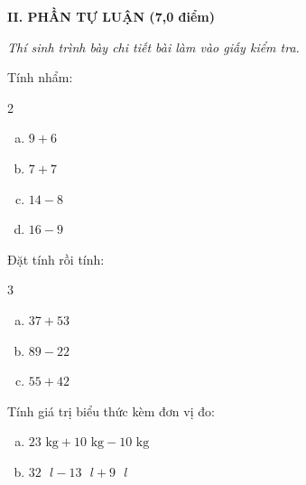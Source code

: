 \vspace{4mm}
\textbf{\large II. PHẦN TỰ LUẬN (7,0 điểm)}

{\itshape Thí sinh trình bày chi tiết bài làm vào giấy kiểm tra.}

\begin{bt}[1,0 điểm]
Tính nhẩm:
\begin{multicols}{2}
\begin{enumerate}[a)]
  \item $9 + 6$
  \item $7 + 7$
  \item $14 - 8$
  \item $16 - 9$
\end{enumerate}
\end{multicols}
\end{bt}

\begin{bt}[1,5 điểm]
Đặt tính rồi tính:
\begin{multicols}{3}
\begin{enumerate}[a)]
  \item $37 + 53$
  \item $89 - 22$
  \item $55 + 42$
\end{enumerate}
\end{multicols}
\end{bt}

\begin{bt}[1,0 điểm]
Tính giá trị biểu thức kèm đơn vị đo:
\begin{enumerate}[a)]
  \item $23\text{ kg} + 10\text{ kg} - 10\text{ kg}$
  \item $32\text{ }l - 13\text{ }l + 9\text{ }l$
\end{enumerate}
\end{bt}

